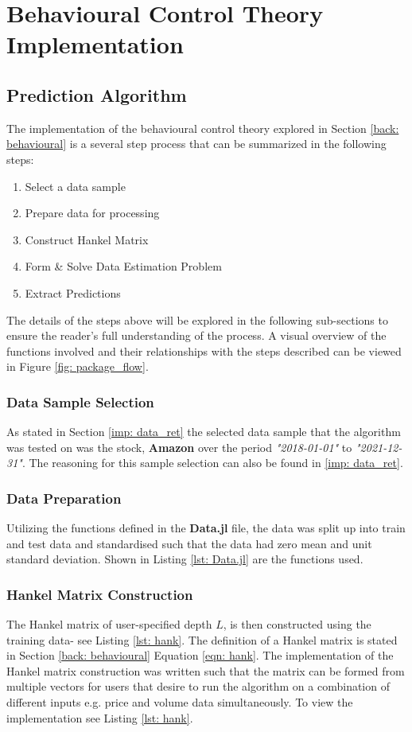 \section{Behavioural Control Theory Implementation}

\subsection{Prediction Algorithm}
The implementation of the behavioural control theory explored in Section \ref{back: behavioural} is a several step process that can be summarized in the following steps:
\begin{enumerate}
    \item Select a data sample
    \item Prepare data for processing
    \item Construct Hankel Matrix
    \item Form \& Solve Data Estimation Problem
    \item Extract Predictions 
\end{enumerate}
    
\noindent The details of the steps above will be explored in the following sub-sections to ensure the reader's full understanding of the process. A visual overview of the functions involved and their relationships with the steps described can be viewed in Figure \ref{fig: package_flow}.

\subsubsection{Data Sample Selection}

As stated in Section \ref{imp: data_ret} the selected data sample that the algorithm was tested on was the stock, \textbf{Amazon} over the period  \textit{"2018-01-01"} to \textit{"2021-12-31"}. The reasoning for this sample selection can also be found in \ref{imp: data_ret}.

\subsubsection{Data Preparation}
Utilizing the functions defined in the \textbf{Data.jl} file, the data was split up into train and test data and standardised such that the data had zero mean and unit standard deviation. Shown in Listing \ref{lst: Data.jl} are the functions used.

\subsubsection{Hankel Matrix Construction}
The Hankel matrix of user-specified depth $L$, is then constructed using the training data- see Listing \ref{lst: hank}. The definition of a Hankel matrix is stated in Section \ref{back: behavioural} Equation \ref{eqn: hank}. The implementation of the Hankel matrix construction was written such that the matrix can be formed from multiple vectors for users that desire to run the algorithm on a combination of different inputs e.g. price and volume data simultaneously. To view the implementation see Listing \ref{lst: hank}.

